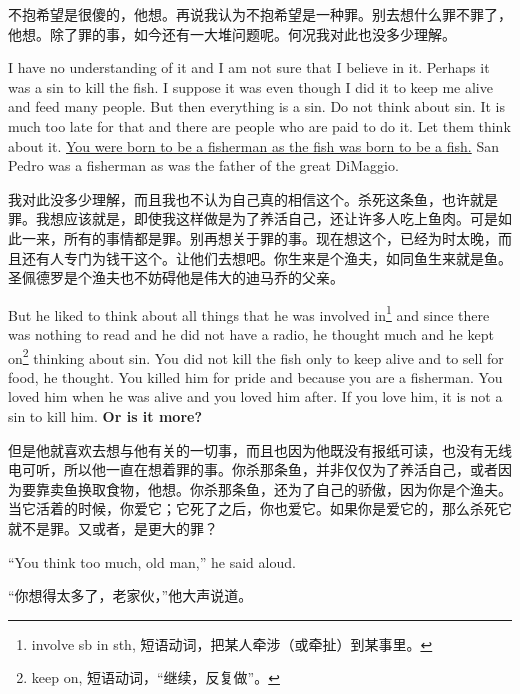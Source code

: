 \begin{paracol}{2}
\switchcolumn

不抱希望是很傻的，他想。再说我认为不抱希望是一种罪。别去想什么罪不罪了，他想。除了罪的事，如今还有一大堆问题呢。何况我对此也没多少理解。

\switchcolumn*

I have no understanding of it and I am not sure that I believe in it.
Perhaps it was a sin to kill the fish. I suppose it was even though I did it
to keep me alive and feed many people. But then everything is a sin. Do not
think about sin. It is much too late for that and there are people who are
paid to do it. Let them think about it. \uline{You were born to be a
  fisherman as the fish was born to be a fish.} San Pedro was a fisherman as
was the father of the great DiMaggio.

\switchcolumn

我对此没多少理解，而且我也不认为自己真的相信这个。杀死这条鱼，也许就是罪。我想应该就是，即使我这样做是为了养活自己，还让许多人吃上鱼肉。可是如此一来，所有的事情都是罪。别再想关于罪的事。现在想这个，已经为时太晚，而且还有人专门为钱干这个。让他们去想吧。你生来是个渔夫，如同鱼生来就是鱼。圣佩德罗是个渔夫也不妨碍他是伟大的迪马乔的父亲。

\switchcolumn*

But he liked to think about all things that he was \gls{involved}
in\footnote{involve sb in sth, 短语动词，把某人牵涉（或牵扯）到某事里。} and
since there was nothing to read and he did not have a radio, he thought much
and he kept on\footnote{keep on, 短语动词，“继续，反复做”。} thinking
about sin. You did not kill the fish only to keep alive and to sell for
food, he thought. You killed him for pride and because you are a fisherman.
You loved him when he was alive and you loved him after. If you love him, it
is not a sin to kill him. \textbf{Or is it more?}

\switchcolumn

但是他就喜欢去想与他有关的一切事，而且也因为他既没有报纸可读，也没有无线电可听，所以他一直在想着罪的事。你杀那条鱼，并非仅仅为了养活自己，或者因为要靠卖鱼换取食物，他想。你杀那条鱼，还为了自己的骄傲，因为你是个渔夫。当它活着的时候，你爱它；它死了之后，你也爱它。如果你是爱它的，那么杀死它就不是罪。又或者，是更大的罪？

\switchcolumn*

``You think too much, old man,'' he said aloud.

\switchcolumn

“你想得太多了，老家伙，”他大声说道。

\switchcolumn*


\end{paracol}
